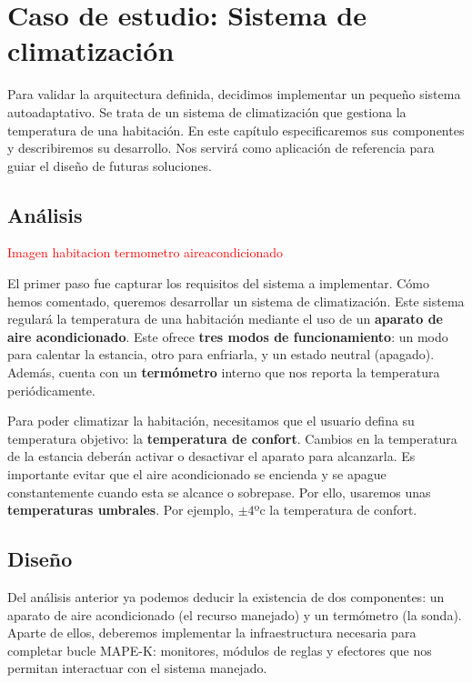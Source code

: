 \chapter{Caso de estudio: Sistema de climatización}
\label{chap:caso_estudio}

Para validar la arquitectura definida, decidimos implementar un pequeño sistema autoadaptativo. Se trata de un sistema de climatización que gestiona la temperatura de una habitación. En este capítulo especificaremos sus componentes y describiremos su desarrollo. Nos servirá como aplicación de referencia para guiar el diseño de futuras soluciones.

\section{Análisis}

\textcolor{red}{Imagen habitacion termometro aireacondicionado}

El primer paso fue capturar los requisitos del sistema a implementar. Cómo hemos comentado, queremos desarrollar un sistema de climatización. Este sistema regulará la temperatura de una habitación mediante el uso de un \textbf{aparato de aire acondicionado}. Este ofrece \textbf{tres modos de funcionamiento}: un modo para calentar la estancia, otro para enfriarla, y un estado neutral (apagado). Además, cuenta con un \textbf{termómetro} interno que nos reporta la temperatura periódicamente.

Para poder climatizar la habitación, necesitamos que el usuario defina su temperatura objetivo: la \textbf{temperatura de confort}. Cambios en la temperatura de la estancia deberán activar o desactivar el aparato para alcanzarla. Es importante evitar que el aire acondicionado se encienda y se apague constantemente cuando esta se alcance o sobrepase. Por ello, usaremos unas \textbf{temperaturas umbrales}. Por ejemplo, $\pm 4$ºc la temperatura de confort.

\section{Diseño}

Del análisis anterior ya podemos deducir la existencia de dos componentes: un aparato de aire acondicionado (el recurso manejado) y un termómetro (la sonda). Aparte de ellos, deberemos implementar la infraestructura necesaria para completar bucle MAPE-K: monitores, módulos de reglas y efectores que nos permitan interactuar con el sistema manejado.

